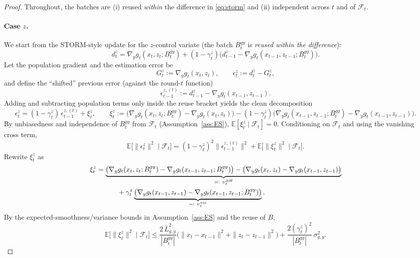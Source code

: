 \documentclass{uai2026} %
\newcommand{\EE}{\mathbb{E}}
\newcommand{\F}{\mathcal{F}}
\begin{document}
\begin{proof}
Throughout, the batches are (i) reused \emph{within} the difference in \eqref{eq:storm} and (ii) independent across $t$ and of $\F_t$.

\paragraph{Case $z$.}
We start from the STORM-style update for the $z$-control variate (the batch $B_t^{gy}$ is \emph{reused within the difference}):
\[
d_t^z
= \nabla_y g_t(x_t,z_t;B_t^{gy})
+ (1-\gamma_t^z)\Big(d_{t-1}^z-\nabla_y g_t(x_{t-1},z_{t-1};B_t^{gy})\Big).
\]
Let the population gradient and the estimation error be
\[
G_t^z:=\nabla_y g_t(x_t,z_t),\qquad \epsilon_t^z:=d_t^z-G_t^z,
\]
and define the ``shifted'' previous error (against the round-$t$ function)
\[
\epsilon_{t-1}^{z,(t)}:=d_{t-1}^z-\nabla_y g_t(x_{t-1},z_{t-1}).
\]
Adding and subtracting population terms only inside the reuse bracket yields the clean decomposition
\begin{equation}\label{eq:z-decomp}
\epsilon_t^z
=(1-\gamma_t^z)\,\epsilon_{t-1}^{z,(t)}
+\xi_t^z,
\qquad
\xi_t^z:=\big(\nabla_y g_t(x_t,z_t;B_t^{gy})-\nabla_y g_t(x_t,z_t)\big)
-(1-\gamma_t^z)\big(\nabla_y g_t(x_{t-1},z_{t-1};B_t^{gy})-\nabla_y g_t(x_{t-1},z_{t-1})\big).
\end{equation}
By unbiasedness and independence of $B_t^{gy}$ from $\F_t$ (Assumption~\ref{ass:ES}), $\EE[\xi_t^z\mid\F_t]=0$.
Conditioning on $\F_t$ and using the vanishing cross term,
\begin{equation}\label{eq:z-basic-mse}
\EE\!\big[\|\epsilon_t^z\|^2\mid\F_t\big]
=(1-\gamma_t^z)^2\|\epsilon_{t-1}^{z,(t)}\|^2
+\EE\!\big[\|\xi_t^z\|^2\mid\F_t\big].
\end{equation}
Rewrite $\xi_t^z$ as
\begin{align}
    \MoveEqLeft[4]\xi_t^z
=\underbrace{\big(\nabla_y g_t(x_t,z_t;B_t^{gy})-\nabla_y g_t(x_{t-1},z_{t-1};B_t^{gy})\big)
-\big(\nabla_y g_t(x_t,z_t)-\nabla_y g_t(x_{t-1},z_{t-1})\big)}_{=:~\upsilon_t^{\text{diff}}}
\nonumber\\
&+\gamma_t^z\underbrace{\big(\nabla_y g_t(x_{t-1},z_{t-1})-\nabla_y g_t(x_{t-1},z_{t-1};B_t^{gy})\big)}_{=:~\upsilon_t^{\text{var}}}.
\end{align}
By the expected-smoothness/variance bounds in Assumption~\ref{ass:ES} and the reuse of $B$,
\begin{equation}\label{eq:z-noise}
\EE\!\big[\|\xi_t^z\|^2\mid\F_t\big]
\le \frac{2\,\overline L_{g,y}^2}{|B_t^{gy}|}\Big(\|x_t-x_{t-1}\|^2+\|z_t-z_{t-1}\|^2\Big)
+ \frac{2(\gamma_t^z)^2}{|B_t^{gy}|}\,\sigma_{g,y}^2.
\end{equation}


\end{proof}
\end{document}
